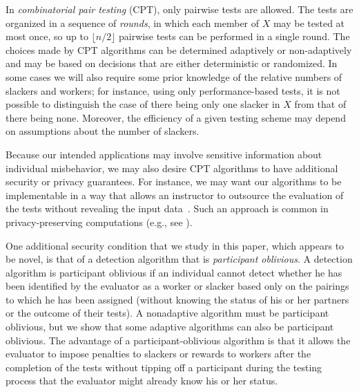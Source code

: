 \documentclass[11pt]{llncs}
\begin{document}
In \emph{combinatorial pair testing} (CPT), only
pairwise tests are allowed. The tests are organized in a sequence of \emph{rounds}, 
in which each member of $X$ may be tested at most once, so up to $\lfloor n/2\rfloor$ pairwise tests can be performed in a single round. 
The choices made by CPT algorithms
can be determined adaptively or non-adaptively
and may be based on decisions that are either deterministic or randomized.
In some cases we will also require some prior knowledge of the relative numbers
of slackers and workers; for instance, using only performance-based tests,
it is not possible to distinguish the case of there being
only one slacker in $X$ from that of there being none.
Moreover, the efficiency of a given testing scheme may depend on
assumptions about the number of slackers.

Because our intended applications may involve sensitive information about individual misbehavior, we may also desire CPT algorithms to have additional security or privacy 
guarantees.
For instance, we may want our algorithms to be implementable in a way that
allows an instructor to outsource the evaluation of the tests without
revealing the input data~\cite{Atallah:2008}.
Such an approach is common in privacy-preserving computations (e.g., see
\cite{Yao1986}).

One additional security condition that we study in this paper, which appears to
be novel, is that of a detection algorithm
that is \emph{participant oblivious}.
A detection algorithm is participant oblivious if an individual
cannot detect whether he has been identified by the evaluator as a worker or
slacker based only on the pairings to which he has been assigned (without knowing the status of his or her partners or the outcome of their tests).
A nonadaptive algorithm must be participant oblivious, but we show
that some adaptive algorithms can also be participant oblivious.
The advantage of a participant-oblivious algorithm is that it allows the
evaluator to impose penalties to slackers or rewards to workers after the completion of the tests without tipping off a participant during
the testing process that the evaluator might already know his or her status.
\end{document}

